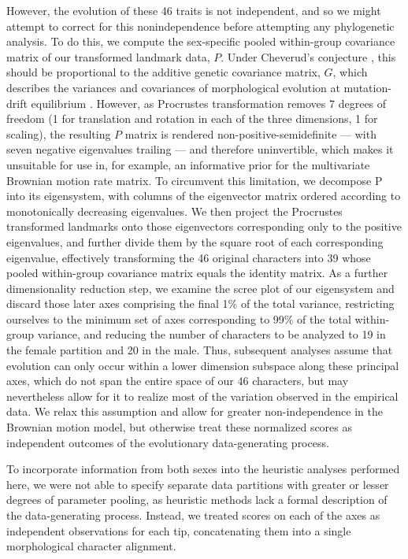 However, the evolution of these 46 traits is not independent, and so we might attempt to correct for this nonindependence before attempting any phylogenetic analysis. To do this, we compute the sex-specific pooled within-group covariance matrix of our transformed landmark data, $P$. Under Cheverud's conjecture \citep{cheverudDevelopmentalIntegrationEvolution1996}, this should be proportional to the additive genetic covariance matrix, $G$, which describes the variances and covariances of morphological evolution at mutation-drift equilibrium \citep{weaverNeutralTheoryEvolution2018a}. However, as Procrustes transformation removes 7 degrees of freedom (1 for translation and rotation in each of the three dimensions, 1 for scaling), the resulting $P$ matrix is rendered non-positive-semidefinite --- with seven negative eigenvalues trailing --- and therefore uninvertible, which makes it unsuitable for use in, for example, an informative prior for the multivariate Brownian motion rate matrix. To circumvent this limitation, we decompose P into its eigensystem, with columns of the eigenvector matrix ordered according to monotonically decreasing eigenvalues. We then project the Procrustes transformed landmarks onto those eigenvectors corresponding only to the positive eigenvalues, and further divide them by the square root of each corresponding eigenvalue, effectively transforming the 46 original characters into 39 whose pooled within-group covariance matrix equals the identity matrix. As a further dimensionality reduction step, we examine the scree plot of our eigensystem and discard those later axes comprising the final 1\% of the total variance, restricting ourselves to the minimum set of axes corresponding to 99\% of the total within-group variance, and reducing the number of characters to be analyzed to 19 in the female partition and 20 in the male. Thus, subsequent analyses assume that evolution can only occur within a lower dimension subspace along these principal axes, which do not span the entire space of our 46 characters, but may nevertheless allow for it to realize most of the variation observed in the empirical data. We relax this assumption and allow for greater non-independence in the Brownian motion model, but otherwise treat these normalized scores as independent outcomes of the evolutionary data-generating process.

To incorporate information from both sexes into the heuristic analyses performed here, we were not able to specify separate data partitions with greater or lesser degrees of parameter pooling, as heuristic methods lack a formal description of the data-generating process. Instead, we treated scores on each of the axes as independent observations for each tip, concatenating them into a single morphological character alignment.

